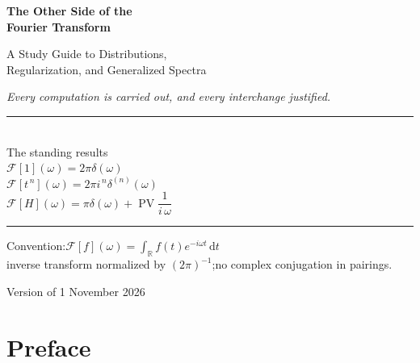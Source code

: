 \documentclass[11pt,openany,oneside]{book}
\theoremstyle{plain}
\theoremstyle{definition}
\theoremstyle{remark}
\numberwithin{equation}{chapter}
\newcommand{\F}{\mathcal{F}}
\newcommand{\R}{\mathbb{R}}
\newcommand{\PV}{\operatorname{PV}}
\begin{document}
\begin{titlepage}
\centering
\vspace*{2.4cm}

{\Huge\bfseries The Other Side of the\\[0.3em] Fourier Transform}

\vspace{0.8cm}

{\Large A Study Guide to Distributions,\\[0.15em] Regularization, and Generalized Spectra}

\vspace{0.6cm}

{\large\itshape Every computation is carried out, and every interchange justified.}

\vspace{1.8cm}

\begin{minipage}{0.82\textwidth}
\centering
\rule{\textwidth}{0.4pt}\\[0.9em]
{\large The standing results}\\[1.0em]
$\F[1](\omega)=2\pi\delta(\omega)$\\[0.7em]
$\F[t^{\,n}](\omega)=2\pi i^{\,n}\delta^{(n)}(\omega)$\\[0.7em]
$\F[H](\omega)=\pi\delta(\omega)+\PV\dfrac{1}{i\,\omega}$\\[0.9em]
\rule{\textwidth}{0.4pt}
\end{minipage}

\vfill

\begin{minipage}{0.9\textwidth}
\centering\small
Convention:\quad $\F[f](\omega)=\int_{\R}f(t)e^{-i\omega t}\,\mathrm{d}t$\\[0.35em]
inverse transform normalized by $(2\pi)^{-1}$;\quad no complex conjugation in pairings.
\end{minipage}

\vspace{0.6cm}

{\small Version of 1 November 2026}

\vspace{0.6cm}
\end{titlepage}

\frontmatter

\chapter*{Preface}
\end{document}
